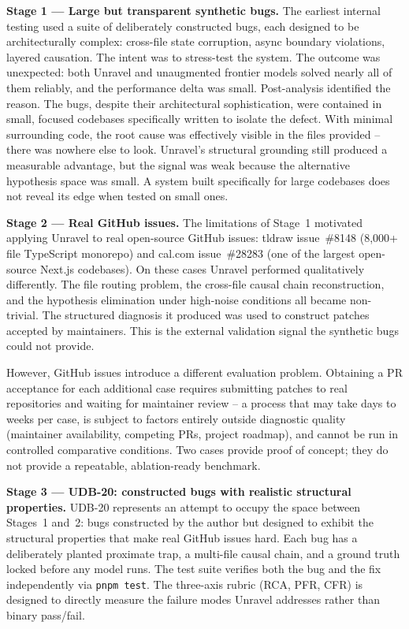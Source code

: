 \documentclass[12pt,a4paper]{article}
\newcommand{\code}[1]{\texttt{\small #1}}
\begin{document}
\textbf{Stage 1 — Large but transparent synthetic bugs.}
The earliest internal testing used a suite of deliberately constructed bugs, each
designed to be architecturally complex: cross-file state corruption, async boundary
violations, layered causation. The intent was to stress-test the system. The outcome
was unexpected: both Unravel and unaugmented frontier models solved nearly all of them
reliably, and the performance delta was small. Post-analysis identified the reason. The
bugs, despite their architectural sophistication, were contained in small, focused
codebases specifically written to isolate the defect. With minimal surrounding code,
the root cause was effectively visible in the files provided -- there was nowhere else
to look. Unravel's structural grounding still produced a measurable advantage, but the
signal was weak because the alternative hypothesis space was small. A system built
specifically for large codebases does not reveal its edge when tested on small ones.

\textbf{Stage 2 — Real GitHub issues.}
The limitations of Stage~1 motivated applying Unravel to real open-source GitHub issues:
tldraw issue~\#8148 (8,000+ file TypeScript monorepo) and cal.com issue~\#28283 (one of
the largest open-source Next.js codebases). On these cases Unravel performed qualitatively
differently. The file routing problem, the cross-file causal chain reconstruction, and the
hypothesis elimination under high-noise conditions all became non-trivial. The structured
diagnosis it produced was used to construct patches accepted by maintainers. This is the
external validation signal the synthetic bugs could not provide.

However, GitHub issues introduce a different evaluation problem. Obtaining a PR
acceptance for each additional case requires submitting patches to real repositories and
waiting for maintainer review -- a process that may take days to weeks per case, is
subject to factors entirely outside diagnostic quality (maintainer availability, competing
PRs, project roadmap), and cannot be run in controlled comparative conditions. Two cases
provide proof of concept; they do not provide a repeatable, ablation-ready benchmark.

\textbf{Stage 3 — UDB-20: constructed bugs with realistic structural properties.}
UDB-20 represents an attempt to occupy the space between Stages~1 and~2: bugs constructed
by the author but designed to exhibit the structural properties that make real GitHub issues
hard. Each bug has a deliberately planted proximate trap, a multi-file causal chain, and
a ground truth locked before any model runs. The test suite verifies both the bug and the
fix independently via \code{pnpm test}. The three-axis rubric (RCA, PFR, CFR) is designed
to directly measure the failure modes Unravel addresses rather than binary pass/fail.
\end{document}
